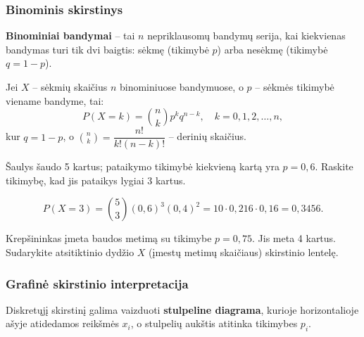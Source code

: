 \subsubsection*{Binominis skirstinys}

\begin{definition}
\textbf{Binominiai bandymai} – tai $n$ nepriklausomų bandymų serija, kai kiekvienas bandymas turi tik dvi baigtis: sėkmę (tikimybė $p$) arba nesėkmę (tikimybė $q = 1 - p$).
\end{definition}

\begin{theorem}
Jei $X$ – sėkmių skaičius $n$ binominiuose bandymuose, o $p$ – sėkmės tikimybė viename bandyme, tai:
\[
P(X = k) = \binom{n}{k} p^k q^{n-k}, \quad k = 0, 1, 2, \ldots, n,
\]
kur $q = 1 - p$, o $\binom{n}{k} = \dfrac{n!}{k!(n-k)!}$ – derinių skaičius.
\end{theorem}

\begin{example}
Šaulys šaudo 5 kartus; pataikymo tikimybė kiekvieną kartą yra $p = 0{,}6$. Raskite tikimybę, kad jis pataikys lygiai 3 kartus.

\[
P(X = 3) = \binom{5}{3}(0{,}6)^3(0{,}4)^2 = 10 \cdot 0{,}216 \cdot 0{,}16 = 0{,}3456.
\]
\end{example}

\begin{exercise}
Krepšininkas įmeta baudos metimą su tikimybe $p = 0{,}75$. Jis meta 4 kartus. Sudarykite atsitiktinio dydžio $X$ (įmestų metimų skaičiaus) skirstinio lentelę.
\end{exercise}

\subsubsection*{Grafinė skirstinio interpretacija}

Diskretųjį skirstinį galima vaizduoti \textbf{stulpeline diagrama}, kurioje horizontalioje ašyje atidedamos reikšmės $x_i$, o stulpelių aukštis atitinka tikimybes $p_i$.

\begin{center}
\end{center}

